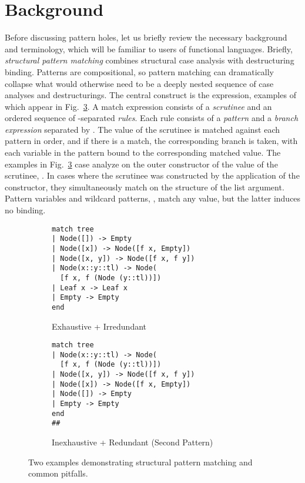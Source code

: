 \section{Background}
\label{sec:background}
Before discussing pattern holes, let us briefly review the necessary background and terminology, which will be familiar to users of functional languages. 
Briefly,
\emph{structural pattern matching} combines structural case analysis with destructuring binding. 
Patterns are compositional, so pattern matching can dramatically collapse what would otherwise 
need to be a deeply nested sequence of case analyses and destructurings. The central construct is the  expression, examples of which appear in  Fig.~\ref{fig:basic-examples}. A match expression consists of a \emph{scrutinee} and an ordered sequence of \li{|}-separated \emph{rules}. Each rule consists of a \emph{pattern} and a \emph{branch expression} separated by \li{->}. The value of the scrutinee is matched against each pattern in order, and if there is a match, the corresponding branch is taken,
with each variable in the pattern bound to the corresponding matched value. The examples in  Fig.~\ref{fig:basic-examples} 
case analyze on the outer constructor of the value of the {scrutinee}, . In cases where the scrutinee was constructed by the application of the  constructor, they simultaneously match on the structure of the list argument. Pattern variables and wildcard patterns, \li{_}, match any value, but the latter induces no binding.

\begin{figure}
\begin{subfigure}{.45\textwidth}
\begin{lstlisting}[numbers=none]
match tree
| Node([]) -> Empty
| Node([x]) -> Node([f x, Empty])
| Node([x, y]) -> Node([f x, f y])
| Node(x::y::tl) -> Node(
  [f x, f (Node (y::tl))])
| Leaf x -> Leaf x
| Empty -> Empty
end\end{lstlisting}
\vspace{-6px}
\caption{Exhaustive + Irredundant\label{fig:basic-examples-correct}}
\end{subfigure}
\begin{subfigure}{.5\textwidth}
\begin{lstlisting}[numbers=none]
match tree
| Node(x::y::tl) -> Node(
  [f x, f (Node (y::tl))])
| Node([x, y]) -> Node([f x, f y])
| Node([x]) -> Node([f x, Empty])
| Node([]) -> Empty
| Empty -> Empty
end
##\end{lstlisting}
\vspace{-6px}
\caption{Inexhaustive + Redundant (Second Pattern)\label{fig:basic-examples-wrong}}
\end{subfigure}
\vspace{-3px}
\caption{Two examples demonstrating structural pattern matching and common pitfalls.}
\vspace{-4px}
\label{fig:basic-examples}
\end{figure}

